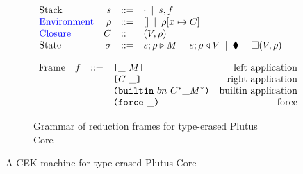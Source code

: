 \documentclass[../plutus-core-specification.tex]{subfiles}
\begin{document}
\begin{figure}[H]
\begin{subfigure}[c]{\linewidth}
    \centering
    \[\begin{array}{lrclr}
        \textrm{Stack} & s      & ::= & \cdot \enspace | \enspace s,f\\
 \textcolor{blue}{ \textrm{Environment}} & \rho & ::= & [] \enspace | \enspace \rho[x \mapsto C] \\
        \textcolor{blue}{ \textrm{Closure}} & C  & ::= & (V,\rho) \\
        \textrm{State} & \sigma & ::= & s;\rho \triangleright M \enspace | \enspace s;\rho \triangleleft V  \enspace | \enspace \blacklozenge{} \enspace | \enspace \square (V,\rho)\\
    \end{array}\]

    \label{fig:untyped-cek-frames}
\end{subfigure}
\begin{subfigure}[c]{\linewidth}
    \centering
    \[\begin{array}{lrclr}
        \textrm{Frame} & f  & ::=   & \texttt{[} \_ ~ M \texttt{]}          & \textrm{left application}\\
                       &   &     & \texttt{[} C ~ \_ \texttt{]}            & \textrm{right application}\\
                       &   &     & \texttt{(} \texttt{builtin} ~ bn ~ C^* \_ M^* \texttt{)}  & \textrm{builtin application}\\
                       &   &     & \texttt{(} \texttt{force} ~ \_ \texttt{)}                  & \textrm{force}
    \end{array}\]
    \caption{Grammar of reduction frames for type-erased Plutus Core}
    \label{fig:untyped-cek-reduction-frames}
\end{subfigure}
\caption{A CEK machine for type-erased Plutus Core}
\end{figure}
\end{document}
